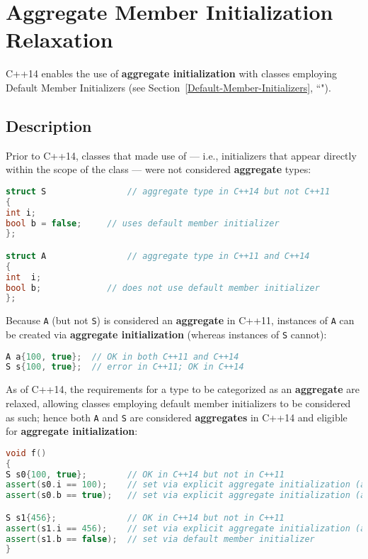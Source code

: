 \newpage
\section[Aggregate Member Initialization Relaxation]{Aggregate Member Initialization Relaxation}\label{aggregate-member-initialization-relaxation}

C++14 enables the use of \textbf{aggregate initialization} with classes
employing Default Member Initializers (see Section~\ref{Default-Member-Initializers}, ``").

\subsection[Description]{Description}\label{description}

Prior to C++14, classes that made use of  --- i.e., initializers that appear directly within the
scope of the class --- were not considered \textbf{aggregate} types:

\begin{lstlisting}[language=C++]
struct S                // aggregate type in C++14 but not C++11
{
int i;
bool b = false;     // uses default member initializer
};

struct A                // aggregate type in C++11 and C++14
{
int  i;
bool b;             // does not use default member initializer
};
\end{lstlisting}

\noindent Because \texttt{A} (but not \texttt{S}) is considered an \textbf{aggregate} in
C++11, instances of \texttt{A} can be created via \textbf{aggregate
initialization} (whereas instances of \texttt{S} cannot):

\begin{lstlisting}[language=C++]
A a{100, true};  // OK in both C++11 and C++14
S s{100, true};  // error in C++11; OK in C++14
\end{lstlisting}


\noindent As of C++14, the requirements for a type to be categorized as an
\textbf{aggregate} are relaxed, allowing classes employing default
member initializers to be considered as such; hence both \texttt{A} and
\texttt{S} are considered \textbf{aggregates} in C++14 and eligible for
\textbf{aggregate initialization}:

\begin{lstlisting}[language=C++]
void f()
{
S s0{100, true};        // OK in C++14 but not in C++11
assert(s0.i == 100);    // set via explicit aggregate initialization (above)
assert(s0.b == true);   // set via explicit aggregate initialization (above)

S s1{456};              // OK in C++14 but not in C++11
assert(s1.i == 456);    // set via explicit aggregate initialization (above)
assert(s1.b == false);  // set via default member initializer
}
\end{lstlisting}

